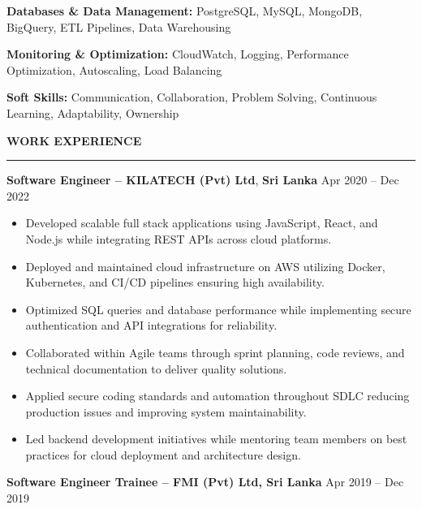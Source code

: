 \documentclass[10pt,letterpaper]{article}
\begin{document}
\textbf{Databases \& Data Management:} PostgreSQL, MySQL, MongoDB, BigQuery, ETL Pipelines, Data Warehousing

\textbf{Monitoring \& Optimization:} CloudWatch, Logging, Performance Optimization, Autoscaling, Load Balancing

\textbf{Soft Skills:} Communication, Collaboration, Problem Solving, Continuous Learning, Adaptability, Ownership

\vspace{8pt}

\textbf{WORK EXPERIENCE}\\[-8pt]
\noindent\rule{\textwidth}{1pt}

\vspace{-2pt}

\textbf{Software Engineer -- KILATECH (Pvt) Ltd}, \textbf{Sri Lanka} \hfill Apr 2020 -- Dec 2022

\vspace{-1pt}

\begin{itemize}
\item Developed scalable full stack applications using JavaScript, React, and Node.js while integrating REST APIs across cloud platforms.
\item Deployed and maintained cloud infrastructure on AWS utilizing Docker, Kubernetes, and CI/CD pipelines ensuring high availability.
\item Optimized SQL queries and database performance while implementing secure authentication and API integrations for reliability.
\item Collaborated within Agile teams through sprint planning, code reviews, and technical documentation to deliver quality solutions.
\item Applied secure coding standards and automation throughout SDLC reducing production issues and improving system maintainability.
\item Led backend development initiatives while mentoring team members on best practices for cloud deployment and architecture design.
\end{itemize}

\textbf{Software Engineer Trainee -- FMI (Pvt) Ltd, Sri Lanka} \hfill Apr 2019 -- Dec 2019

\vspace{-1pt}
\end{document}
